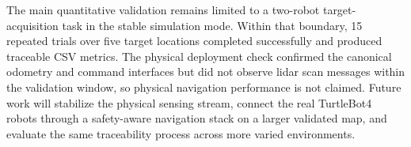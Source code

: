 \documentclass{ieeeaccess}
\begin{document}
The main quantitative validation remains limited to a two-robot target-acquisition task in the stable simulation mode. Within that boundary, 15 repeated trials over five target locations completed successfully and produced traceable CSV metrics. The physical deployment check confirmed the canonical odometry and command interfaces but did not observe lidar scan messages within the validation window, so physical navigation performance is not claimed. Future work will stabilize the physical sensing stream, connect the real TurtleBot4 robots through a safety-aware navigation stack on a larger validated map, and evaluate the same traceability process across more varied environments.











\EOD
\end{document}
